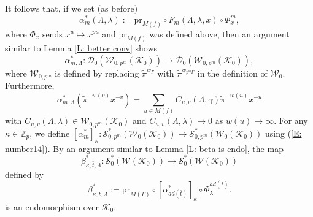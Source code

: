 \documentclass{article}
\theoremstyle{remark}
\def\bb #1{ {\mathbb #1} }
\def\c #1{ {\mathcal #1} }
\begin{document}
It follows that, if we set (as before)
\[
\alpha_m^*(\Lambda, \lambda) := \text{pr}_{M(f)} \circ F_m(\Lambda, \lambda, x) \circ \Phi_x^m,
\]
where $\Phi_x$ sends $x^u \mapsto x^{pu}$ and $\text{pr}_{M(f)}$ was defined above, then an argument similar to Lemma \ref{L: better conv} shows
\[
\alpha_{m, \Lambda}^*: \c D_0(\c W_{0, p^m}(\c K_0)) \rightarrow \c D_0(\c W_{0, p^m}(\c K_0)),
\]
where $\c W_{0, p^m}$ is defined by replacing $\tilde \pi^{w_\Gamma}$ with $\tilde \pi^{w_{p^m \Gamma}}$ in the definition of $\c W_0$. Furthermore, 
\[
\alpha_{m, \Lambda}^*(\tilde \pi^{-w(v)} x^{-v}) = \sum_{u \in M(f)} C_{u, v}(\Lambda, \gamma) \tilde \pi^{-w(u)} x^{-u}
\]
with $C_{u, v}(\Lambda, \lambda) \in \c W_{0, p^m}(\c K_0)$ and $C_{u, v}(\Lambda, \lambda) \rightarrow 0$ as $w(u) \rightarrow \infty$. For any $\kappa \in \bb{Z}_p$, we define $[\alpha^*_m]_{\kappa} : \c S^*_{0,p^m}(\c W_0(\c K_0)) \rightarrow \c S^*_{0,p^m}(\c W_0(\c K_0))$ using (\ref{E: number14}). By an argument similar to Lemma \ref{L: beta is endo}, the map
\[
\beta_{\kappa, \bar t, \Lambda}^*: \c S^*_0(\c W(\c K_0)) \rightarrow \c S^*_0(\c W(\c K_0))
\]
defined by 
\[
\beta_{\kappa, \bar t, \Lambda}^* := \text{pr}_{M(\Gamma)} \circ [ \alpha_{a d(\bar t)}^* ]_\kappa  \circ \Phi_\lambda^{a d(\bar t)}.
\]
is an endomorphism over $\c K_0$. 
\end{document}
